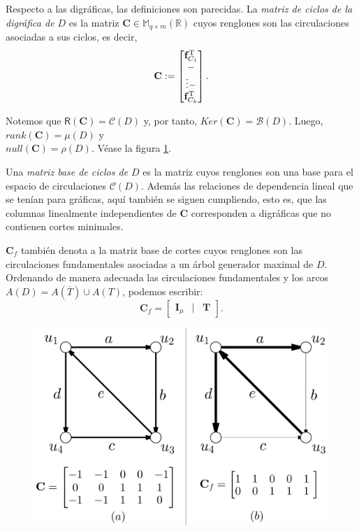 Respecto a las digráficas, las definiciones son parecidas. La \textit{matriz de ciclos de la digráfica de $D$} es la matriz $\mathbf{C} \in \mathbb{M}_{q\times m}(\mathbb{R})$ cuyos renglones son las circulaciones asociadas a sus ciclos, es decir, $$ 
\mathbf{C}:= \begin{bmatrix} 
\mathbf{f}_{C_{1}}^{\textnormal{T}} \\
\-- \\
\vdots
\-- \\
\mathbf{f}_{C_{k}}^{\textnormal{T}}
\end{bmatrix}.
$$

Notemos que  $\mathsf{R}(\mathbf{C}) =\mathcal{C}(D)$ y, por tanto, $Ker(\mathbf{C}) = \mathcal{B}(D)$. Luego, $rank(\mathbf{C}) = \mu(D)$ y \\$null(\mathbf{C}) = \rho(D)$. Véase la figura \ref{fig:matrizdeciclosdirigidos}.

Una \textit{matriz base de ciclos de $D$} es la matriz cuyos renglones son una base para el espacio de circulaciones $\mathcal{C}(D)$. Además las relaciones de dependencia lineal que se tenían para gráficas, aquí también se siguen cumpliendo, esto es, que las columnas linealmente independientes de $\mathbf{C}$ corresponden a digráficas que no contienen cortes minimales.

$\mathbf{C}_{f}$ también denota a la matriz base de cortes cuyos renglones son las circulaciones fundamentales asociadas a un árbol generador maximal de $D$. Ordenando de manera adecuada las circulaciones fundamentales y los arcos $A(D) = A(\overline{T}) \cup A(T)$, podemos escribir:
$$
\mathbf{C}_{f} = \begin{bmatrix}
\mathbf{I}_{\mu} & | & \mathbf{T}
\end{bmatrix}.
$$
\begin{figure}[H]
    \centering
    \includegraphics[scale=0.25]{img/imgchapter4/matrizdeciclosdirigidos.jpg}
    \caption{}
    \label{fig:matrizdeciclosdirigidos}
\end{figure}

